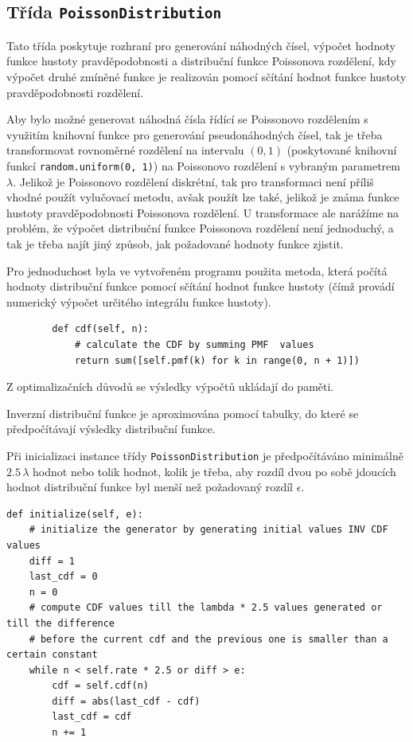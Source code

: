 \documentclass[12pt, a4paper]{article}
\begin{document}
    \subsection{Třída \texttt{PoissonDistribution}}

    Tato třída poskytuje rozhraní pro generování náhodných čísel, výpočet hodnoty funkce hustoty pravděpodobnosti a distribuční
    funkce Poissonova rozdělení, kdy výpočet druhé zmíněné funkce je realizován pomocí sčítání hodnot funkce hustoty
    pravděpodobnosti rozdělení.

    Aby bylo možné generovat náhodná čísla řídící se Poissonovo rozdělením s využitím knihovní funkce pro generování
    pseudonáhodných čísel, tak je třeba transformovat rovnoměrné rozdělení na intervalu $(0, 1)$ (poskytované knihovní funkcí
    \texttt{random.uniform(0, 1)}) na Poissonovo rozdělení s vybraným parametrem $\lambda$.
    Jelikož je Poissonovo rozdělení diskrétní, tak pro transformaci není příliš vhodné použít vylučovací metodu, avšak
    použít lze také, jelikož je známa funkce hustoty pravděpodobnosti Poissonova rozdělení.
    U transformace ale narážíme na problém, že výpočet distribuční funkce Poissonova rozdělení není jednoduchý, a tak je
    třeba najít jiný způsob, jak požadované hodnoty funkce zjistit.

    Pro jednoduchost byla ve vytvořeném programu použita metoda, která počítá hodnoty distribuční funkce pomocí
    sčítání hodnot funkce hustoty (čímž provádí numerický výpočet určitého integrálu funkce hustoty).

    \begin{lstlisting}
        def cdf(self, n):
            # calculate the CDF by summing PMF  values
            return sum([self.pmf(k) for k in range(0, n + 1)])
    \end{lstlisting}

    \noindent Z optimalizačních důvodů se výsledky výpočtů ukládají do paměti.

    Inverzní distribuční funkce je aproximována pomocí tabulky, do které se předpočítávají výsledky distribuční funkce.

    Při inicializaci instance třídy \texttt{PoissonDistribution} je předpočítáváno minimálně $2.5\, \lambda$ hodnot nebo tolik
    hodnot, kolik je třeba, aby rozdíl dvou po sobě jdoucích hodnot distribuční funkce byl menší než požadovaný rozdíl $\epsilon$.

   \begin{lstlisting}
def initialize(self, e):
    # initialize the generator by generating initial values INV CDF values
    diff = 1
    last_cdf = 0
    n = 0
    # compute CDF values till the lambda * 2.5 values generated or till the difference
    # before the current cdf and the previous one is smaller than a certain constant
    while n < self.rate * 2.5 or diff > e:
        cdf = self.cdf(n)
        diff = abs(last_cdf - cdf)
        last_cdf = cdf
        n += 1
   \end{lstlisting}
\end{document}

